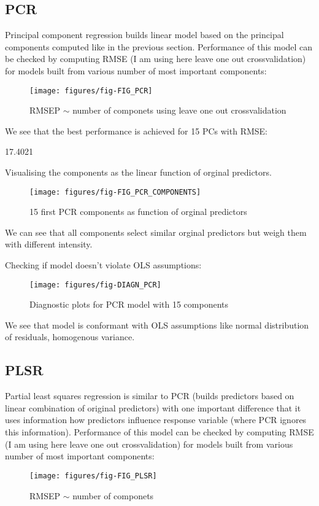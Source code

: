 \documentclass[a4paper]{article}
\begin{document}
\subsection{PCR}
Principal component regression builds linear model based on the principal
components computed like in the previous section. 
Performance of this model can be checked by computing RMSE (I am using here
leave one out crossvalidation) for models built from various number of most
important components: 
\begin{figure}[H]
\begin{center}
\texttt{[image: figures/fig-FIG\_PCR]}
\caption{RMSEP $\sim$ number of componets using leave one out crossvalidation}
\end{center}
\end{figure}
We see that the best performance is achieved for 15 PCs with RMSE: 
\begin{Schunk}
\begin{Soutput}
[1] 17.4021
\end{Soutput}
\end{Schunk}

Visualising the components as the linear function of orginal predictors.
\begin{figure}[H]
\begin{center}
\texttt{[image: figures/fig-FIG\_PCR\_COMPONENTS]}
\caption{15 first PCR components as function of orginal
predictors}
\end{center}
\end{figure}
We can see that all components select similar orginal predictors but weigh them
with different intensity.

Checking if model doesn't violate OLS assumptions:
\begin{figure}[H]
\begin{center}
\texttt{[image: figures/fig-DIAGN\_PCR]}
\caption{Diagnostic plots for PCR model with 15 components}
\end{center}
\end{figure}
We see that model is conformant with OLS assumptions like normal distribution of
residuals, homogenous variance.

\subsection{PLSR}
Partial least squares regression is similar to PCR (builds predictors based on
linear combination of original predictors) with one important difference that
it uses information how predictors influence response variable (where PCR
ignores this information).
Performance of this model can be checked by computing RMSE (I am using here
leave one out crossvalidation) for models built from various number of most
important components: 
\begin{figure}[H]
\begin{center}
\texttt{[image: figures/fig-FIG\_PLSR]}
\caption{RMSEP $\sim$ number of componets}
\end{center}
\end{figure}
\end{document}
